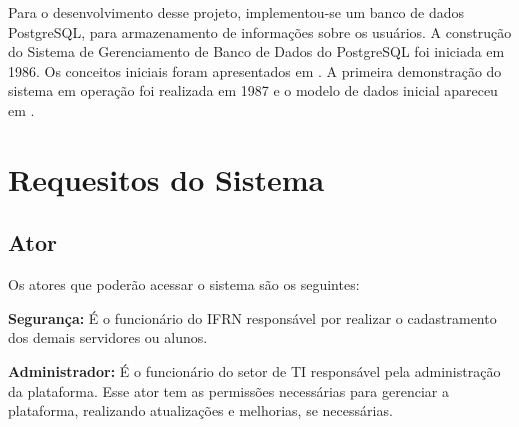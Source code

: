 Para o desenvolvimento desse projeto, implementou-se um banco
de dados PostgreSQL, para armazenamento de informações sobre os usuários. A construção do Sistema de Gerenciamento de Banco de Dados do PostgreSQL foi iniciada em
1986. Os conceitos iniciais foram apresentados em \cite{stonebraker1986design}.  A primeira demonstração do sistema em operação foi realizada em 1987 e
o modelo de dados inicial apareceu em
\cite{stonebraker1988design}.
\section{Requesitos do Sistema}
\subsection{Ator}
Os atores que poderão acessar o sistema são os seguintes:
 
 \textbf{Segurança:} É o funcionário do IFRN responsável por realizar o cadastramento dos demais servidores ou alunos.
 
 \textbf{Administrador:} É o funcionário do setor de TI responsável pela administração da plataforma. Esse ator tem as permissões necessárias para gerenciar a plataforma, realizando atualizações e melhorias, se necessárias.
